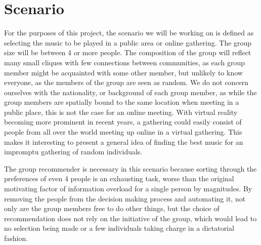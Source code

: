 \section{Scenario}

For the purposes of this project, the scenario we will be working on is defined as selecting the music to be played in a public area or online gathering. The group size will be between 4 or more people. The composition of the group will reflect many small cliques with few connections between communities, as each group member might be acquainted with some other member, but unlikely to know everyone, as the members of the group are seen as random. We do not concern ourselves with the nationality, or background of each group member, as while the group members are spatially bound to the same location when meeting in a public place, this is not the case for an online meeting. With virtual reality becoming more prominent in recent years, a gathering could easily consist of people from all over the world meeting up online in a virtual gathering. This makes it interesting to present a general idea of finding the best music for an impromptu gathering of random individuals. %

The group recommender is necessary in this scenario because sorting through the preferences of even 4 people is an exhausting task, worse than the original motivating factor of information overload for a single person by magnitudes. By removing the people from the decision making process and automating it, not only are the group members free to do other things, but the choice of recommendation does not rely on the initiative of the group, which would lead to no selection being made or a few individuals taking charge in a dictatorial fashion.

